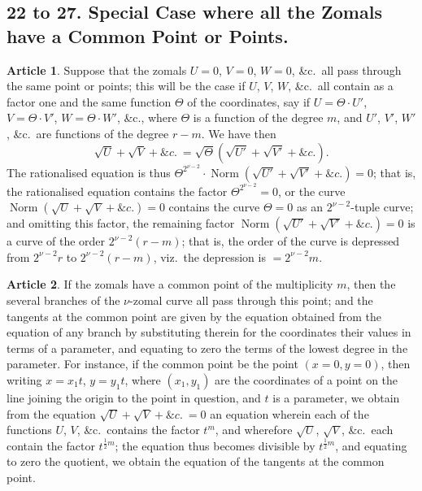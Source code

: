 \documentclass[11pt,a4paper]{article}
\theoremstyle{definition}
\newtheorem{art}{Article}
\DeclareMathOperator{\Norm}{Norm}
\newcommand{\norm}{\Norm}
\begin{document}
\subsection*{22 to 27. Special Case where all the Zomals have a Common Point or Points.}

\begin{art}
Suppose that the zomals $U = 0$, $V = 0$, $W = 0$, \&c.\ all pass through the same point or points; this will be the case if $U$, $V$, $W$, \&c.\ all contain as a factor one and the same function $\Theta$ of the coordinates, say if $U = \Theta \cdot U'$, $V = \Theta \cdot V'$, $W = \Theta \cdot W'$, \&c., where $\Theta$ is a function of the degree $m$, and $U'$, $V'$, $W'$, \&c.\ are functions of the degree $r - m$. We have then
\[
\sqrt{U} + \sqrt{V} + \&c.\ = \sqrt{\Theta}(\sqrt{U'} + \sqrt{V'} + \&c.).
\]
The rationalised equation is thus $\Theta^{2^{\nu-2}} \cdot \norm(\sqrt{U'} + \sqrt{V'} + \&c.) = 0$; that is, the rationalised equation contains the factor $\Theta^{2^{\nu-2}} = 0$, or the curve $\norm(\sqrt{U} + \sqrt{V} + \&c.) = 0$ contains the curve $\Theta = 0$ as an $2^{\nu-2}$-tuple curve; and omitting this factor, the remaining factor $\norm(\sqrt{U'} + \sqrt{V'} + \&c.) = 0$ is a curve of the order $2^{\nu-2}(r - m)$; that is, the order of the curve is depressed from $2^{\nu-2}r$ to $2^{\nu-2}(r - m)$, viz.\ the depression is $= 2^{\nu-2}m$.
\end{art}

\begin{art}
If the zomals have a common point of the multiplicity $m$, then the several branches of the $\nu$-zomal curve all pass through this point; and the tangents at the common point are given by the equation obtained from the equation of any branch by substituting therein for the coordinates their values in terms of a parameter, and equating to zero the terms of the lowest degree in the parameter. For instance, if the common point be the point $(x = 0, y = 0)$, then writing $x = x_{1}t$, $y = y_{1}t$, where $(x_{1}, y_{1})$ are the coordinates of a point on the line joining the origin to the point in question, and $t$ is a parameter, we obtain from the equation $\sqrt{U} + \sqrt{V} + \&c.\ = 0$ an equation wherein each of the functions $U$, $V$, \&c.\ contains the factor $t^{m}$, and wherefore $\sqrt{U}$, $\sqrt{V}$, \&c.\ each contain the factor $t^{\frac{1}{2}m}$; the equation thus becomes divisible by $t^{\frac{1}{2}m}$, and equating to zero the quotient, we obtain the equation of the tangents at the common point.
\end{art}
\end{document}
